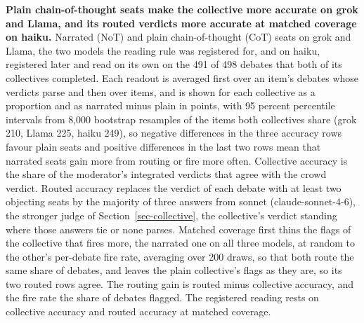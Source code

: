 \begin{table}[t]
\centering
\small
\caption{\textbf{Plain chain-of-thought seats make the collective more
accurate on grok and Llama, and its routed verdicts more accurate at matched
coverage on haiku.} Narrated (NoT) and plain chain-of-thought (CoT) seats on
grok and Llama, the two models the reading rule was registered for, and on
haiku, registered later and read on its own on the 491 of 498 debates that
both of its collectives completed.
Each readout is averaged first over an item's debates whose verdicts parse
and then over items, and is shown for each collective as a proportion and as
narrated minus plain in points, with 95 percent percentile intervals from
8,000 bootstrap resamples of the items both collectives share (grok 210,
Llama 225, haiku 249), so negative differences in the three accuracy rows favour plain
seats and positive differences in the last two rows mean that narrated seats
gain more from routing or fire more often. Collective accuracy is the share
of the moderator's integrated verdicts that agree with the crowd verdict.
Routed accuracy replaces the verdict of each debate with at least two
objecting seats by the majority of three answers from sonnet
(claude-sonnet-4-6), the stronger judge of Section~\ref{sec-collective}, the collective's verdict
standing where those answers tie or none parses. Matched coverage first
thins the flags of the collective that fires more, the narrated one on all
three models, at random to the other's per-debate fire rate, averaging over 200
draws, so that both route the same share of debates, and leaves the plain
collective's flags as they are, so its two routed rows agree. The routing
gain is routed minus collective accuracy, and the fire rate the share of
debates flagged. The registered reading rests on collective accuracy and
routed accuracy at matched coverage.}

\end{table}
